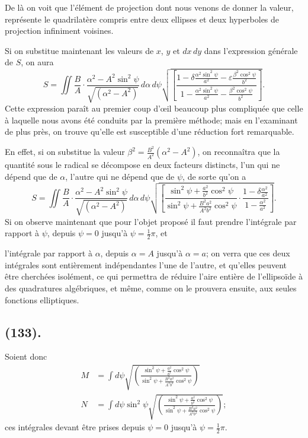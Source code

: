 \documentclass{article}
\begin{document}
De là on voit que l'élément de projection dont nous venons de donner la valeur, représente le quadrilatère compris entre deux ellipses et deux hyperboles de projection infiniment voisines.

Si on substitue maintenant les valeurs de $x$, $y$ et $dx\,dy$ dans l'expression générale de $S$, on aura
\[ S=\iint\frac{B}{A}\cdot\frac{\alpha^{2}-A^{2}\sin^{2}\psi}{\sqrt{(\alpha^{2}-A^{2})}}\,d\alpha\,d\psi\sqrt{\left[\frac{1-\delta\frac{\alpha^{2}\sin^{2}\psi}{a^{2}}-\varepsilon\frac{\beta^{2}\cos^{2}\psi}{b^{2}}}{1-\frac{\alpha^{2}\sin^{2}\psi}{a^{2}}-\frac{\beta^{2}\cos^{2}\psi}{b^{2}}}\right]}. \]
Cette expression paraît au premier coup d'œil beaucoup plus compliquée que celle à laquelle nous avons été conduits par la première méthode; mais en l'examinant de plus près, on trouve qu'elle est susceptible d'une réduction fort remarquable.

En effet, si on substitue la valeur $\beta^{2}=\frac{B^{2}}{A^{2}}(\alpha^{2}-A^{2})$, on reconnaîtra que la quantité sous le radical se décompose en deux facteurs distincts, l'un qui ne dépend que de $\alpha$, l'autre qui ne dépend que de $\psi$, de sorte qu'on a
\[ S=\iint\frac{B}{A}\cdot\frac{\alpha^{2}-A^{2}\sin^{2}\psi}{\sqrt{(\alpha^{2}-A^{2})}}\,d\alpha\,d\psi\sqrt{\left[\frac{\sin^{2}\psi+\frac{a^{2}}{b^{2}}\cos^{2}\psi}{\sin^{2}\psi+\frac{B^{2}a^{2}}{A^{2}b^{2}}\cos^{2}\psi}\cdot\frac{1-\delta\frac{\alpha^{2}}{a^{2}}}{1-\frac{\alpha^{2}}{a^{2}}}\right]}. \]
Si on observe maintenant que pour l'objet proposé il faut prendre l'intégrale par rapport à $\psi$, depuis $\psi=0$ jusqu'à $\psi=\frac{1}{2}\pi$, et

l'intégrale par rapport à $\alpha$, depuis $\alpha=A$ jusqu'à $\alpha=a$; on verra que ces deux intégrales sont entièrement indépendantes l'une de l'autre, et qu'elles peuvent être cherchées isolément, ce qui permettra de réduire l'aire entière de l'ellipsoïde à des quadratures algébriques, et même, comme on le prouvera ensuite, aux seules fonctions elliptiques.

\subsection*{(133).}

Soient donc
\[ \begin{aligned} M&=\int d\psi\sqrt{\left(\frac{\sin^{2}\psi+\frac{a^{2}}{b^{2}}\cos^{2}\psi}{\sin^{2}\psi+\frac{B^{2}a^{2}}{A^{2}b^{2}}\cos^{2}\psi}\right)}\\ N&=\int d\psi\sin^{2}\psi\sqrt{\left(\frac{\sin^{2}\psi+\frac{a^{2}}{b^{2}}\cos^{2}\psi}{\sin^{2}\psi+\frac{B^{2}a^{2}}{A^{2}b^{2}}\cos^{2}\psi}\right)}; \end{aligned} \]
ces intégrales devant être prises depuis $\psi=0$ jusqu'à $\psi=\frac{1}{2}\pi$.
\end{document}
